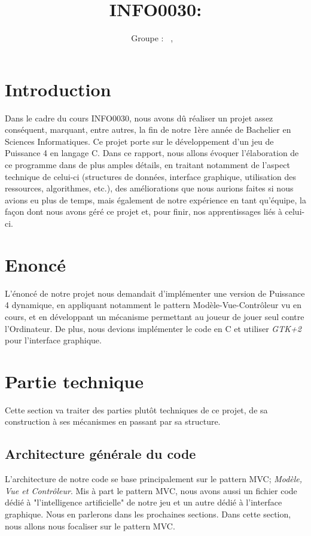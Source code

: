 \documentclass[a4paper, 11pt, oneside]{article}
\title{INFO0030: \intitule}
\author{Groupe \GrNbr : \PrenomUN~\textsc{\NomUN}, \PrenomDEUX~\textsc{\NomDEUX}}
\date{}
\begin{document}
\maketitle
\newpage
\tableofcontents
\newpage


\section{Introduction}
Dans le cadre du cours INFO0030, nous avons dû réaliser un projet assez conséquent, marquant, entre autres, la fin de notre 1ère année de Bachelier en Sciences Informatiques.
Ce projet porte sur le développement d'un jeu de Puissance 4 en langage C.
Dans ce rapport, nous allons évoquer l'élaboration de ce programme dans de plus amples détails,
en traitant notamment de l'aspect technique de celui-ci (structures de données, interface graphique, utilisation des ressources, algorithmes, etc.),
 des améliorations que nous aurions faites si nous avions eu plus de temps, mais également de notre expérience en tant qu'équipe,
  la façon dont nous avons géré ce projet et, pour finir, nos apprentissages liés à celui-ci.

\section{Enoncé}

L'énoncé de notre projet nous demandait d'implémenter une version de Puissance 4 dynamique, en appliquant notamment le pattern Modèle-Vue-Contrôleur vu en cours, et en développant un mécanisme permettant au joueur de jouer seul contre l'Ordinateur. De plus, nous devions implémenter le code en C et utiliser \emph{GTK+2} pour l'interface graphique.

\section{Partie technique}

Cette section va traiter des parties plutôt techniques de ce projet, de sa construction à ses mécanismes en passant par sa structure.

\subsection{Architecture générale du code}
L'architecture de notre code se base principalement sur le pattern MVC; \emph{Modèle, Vue et Contrôleur}. Mis à part le pattern MVC, nous avons aussi un fichier code dédié à "l'intelligence artificielle" de notre jeu et un autre dédié à l'interface graphique. Nous en parlerons dans les prochaines sections. Dans cette section, nous allons nous focaliser sur le pattern MVC.
\end{document}
